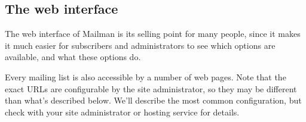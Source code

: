 \documentclass{howto}
\begin{document}
\subsection{The web interface\label{sec:web}}
The web interface of Mailman is its selling point for many people,
since it makes it much easier for subscribers and administrators to see 
which options are available, and what these options do.  

Every mailing list is also accessible by a number of web pages.  Note that
the exact URLs are configurable by the site administrator, so they may be
different than what's described below.  We'll describe the most common
configuration, but check with your site administrator or hosting
service for details.
\end{document}
